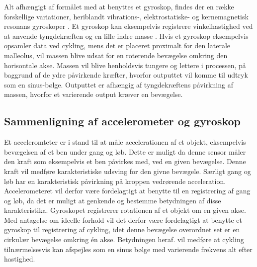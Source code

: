 Alt afhængigt af formålet med at benyttes et gyroskop, findes der en række forskellige variationer, heriblandt vibrations-, elektrostatiske- og kernemagnetisk resonans gyroskoper \citep{LuingeVeltink2005,TittertonWeston2004}. Et gyroskop kan eksempelvis registrere vinkelhastighed ved at anvende tyngdekræften og en lille indre masse \citep{Sparkfun_gyro,Barbour2014}. Hvis et gyroskop eksempelvis opsamler data ved cykling, mens det er placeret proximalt for den laterale malleolus, vil massen blive udsat for en roterende bevægelse omkring den horisontale akse. Massen vil blive henholdsvis tungere og lettere i processen, på baggrund af de ydre påvirkende kræfter, hvorfor outputtet vil komme til udtryk som en sinus-bølge. Outputtet er afhængig af tyngdekræftens påvirkning af massen, hvorfor et varierende output kræver en bevægelse.%
%
\subsection{Sammenligning af accelerometer og gyroskop}
Et acceleromteter er i stand til at måle accelerationen af et objekt, eksempelvis bevægelsen af et ben under gang og løb. Dette er muligt da denne sensor måler den kraft som eksempelvis et ben påvirkes med, ved en given bevægelse. Denne kraft vil medføre karakteristiske udsving for den givne bevægele. Særligt gang og løb har en karakteristisk påvirkning på kroppen vedrørende acceleration. Accelerometeret vil derfor være fordelagtigt at benytte til en registrering af gang og løb, da det er muligt at genkende og bestemme betydningen af disse karakteristika. Gyroskopet registrerer rotationen af et objekt om en given akse. Med antagelse om ideelle forhold vil det derfor være fordelagtigt at benytte et gyroskop til registrering af cykling, idet denne bevægelse overordnet set er en cirkulær bevægelse omkring én akse. Betydningen heraf. vil medføre at cykling tilnærmelsesvis kan afspejles som en sinus bølge med varierende frekvens alt efter hastighed. 

